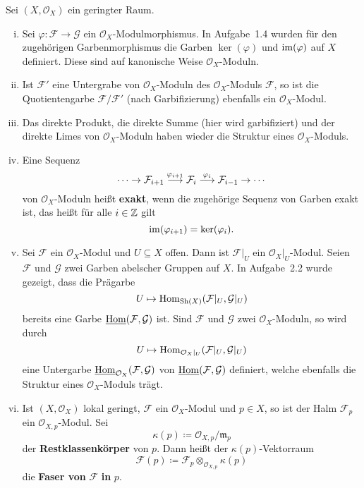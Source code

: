 \begin{bem}
	Sei $(X, \mathcal{O}_X)$ ein geringter Raum.
	\begin{enumerate}[i)]
		\item Sei $\varphi\colon \mathcal{F} \to \mathcal{G}$ ein $\mathcal{O}_X$-Modulmorphismus. In Aufgabe~1.4 wurden für den zugehörigen Garbenmorphismus die Garben $\ker(\varphi)$ und $\operatorname{im}(\varphi)$ auf $X$ definiert. Diese sind auf kanonische Weise $\mathcal{O}_X$-Moduln.
		\item Ist $\mathcal{F}'$ eine Untergrabe von $\mathcal{O}_X$-Moduln des $\mathcal{O}_X$-Moduls $\mathcal{F}$, so ist die Quotientengarbe $\mathcal{F}/\mathcal{F}'$ (nach Garbifizierung) ebenfalls ein $\mathcal{O}_X$-Modul.
		\item Das direkte Produkt, die direkte Summe (hier wird garbifiziert) und der direkte Limes von $\mathcal{O}_X$-Moduln haben wieder die Struktur eines $\mathcal{O}_X$-Moduls.
		\item Eine Sequenz
		\[
			\cdots \to \mathcal{F}_{i+1} \overset{\varphi_{i+1}}{\longrightarrow} \mathcal{F}_i \overset{\varphi_{i}}{\longrightarrow} \mathcal{F}_{i-1} \to \cdots
		\]
		von $\mathcal{O}_X$-Moduln heißt \textbf{exakt}, wenn die zugehörige Sequenz von Garben exakt ist, das heißt für alle $i \in \mathbb {Z}$ gilt
		\[
			\operatorname{im}(\varphi_{i+1}) =  \ker(\varphi_i).
		\]
		\item Sei $\mathcal{F}$ ein $\mathcal{O}_X$-Modul und $U \subseteq X$ offen. Dann ist $\mathcal{F}\vert_U$ ein $\mathcal{O}_X\vert_U$-Modul. Seien $\mathcal{F}$ und $\mathcal{G}$ zwei Garben abelscher Gruppen auf $X$. In Aufgabe~2.2 wurde gezeigt, dass die Prägarbe
		\[
			U \mapsto \operatorname{Hom}_{\operatorname{Sh}(X)}(\mathcal{F}\vert_U,\mathcal{G}\vert_U)
		\]
		bereits eine Garbe $\underline{\operatorname{Hom}}(\mathcal{F},\mathcal{G})$ ist. Sind $\mathcal{F}$ und $\mathcal{G}$ zwei $\mathcal{O}_X$-Moduln, so wird durch
		\[
			U \mapsto \operatorname{Hom}_{\mathcal{O}_X\vert_U}(\mathcal{F}\vert_U,\mathcal{G}\vert_U)
		\]
		eine Untergarbe $\underline{\operatorname{Hom}}_{\mathcal{O}_X}(\mathcal{F},\mathcal{G})$ von $\underline{\operatorname{Hom}}(\mathcal{F},\mathcal{G})$ definiert, welche ebenfalls die Struktur eines $\mathcal{O}_X$-Moduls trägt.
		\item Ist $(X, \mathcal{O}_X)$ lokal geringt, $\mathcal{F}$ ein $\mathcal{O}_X$-Modul und $p\in X$, so ist der Halm $\mathcal{F}_p$ ein $\mathcal{O}_{X,p}$-Modul. Sei
		\[
			\kappa(p) \coloneqq \mathcal{O}_{X,p}/\mathfrak{m}_p
		\]
		der \textbf{Restklassenkörper} von $p$. Dann heißt der $\kappa(p)$-Vektorraum
		\[
			\mathcal{F}(p) \coloneqq \mathcal{F}_p \otimes_{\mathcal{O}_{X,p}} \kappa(p)
		\]
		die \textbf{Faser von} $\mathcal{F}$ \textbf{in} $p$.
	\end{enumerate}
\end{bem}

